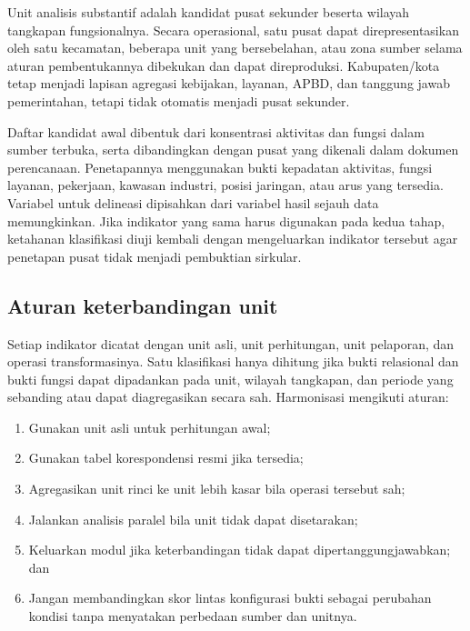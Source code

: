 \documentclass[11pt,a4paper,oneside,openany,indonesian]{report}
\begin{document}
Unit analisis substantif adalah kandidat pusat sekunder beserta wilayah
tangkapan fungsionalnya. Secara operasional, satu pusat dapat
direpresentasikan oleh satu kecamatan, beberapa unit yang bersebelahan,
atau zona sumber selama aturan pembentukannya dibekukan dan dapat
direproduksi. Kabupaten/kota tetap menjadi lapisan agregasi kebijakan,
layanan, APBD, dan tanggung jawab pemerintahan, tetapi tidak otomatis
menjadi pusat sekunder.

Daftar kandidat awal dibentuk dari konsentrasi aktivitas dan fungsi
dalam sumber terbuka, serta dibandingkan dengan pusat yang dikenali
dalam dokumen perencanaan. Penetapannya menggunakan bukti kepadatan
aktivitas, fungsi layanan, pekerjaan, kawasan industri, posisi jaringan,
atau arus yang tersedia. Variabel untuk delineasi dipisahkan dari
variabel hasil sejauh data memungkinkan. Jika indikator yang sama harus
digunakan pada kedua tahap, ketahanan klasifikasi diuji kembali dengan
mengeluarkan indikator tersebut agar penetapan pusat tidak menjadi
pembuktian sirkular.

\subsection{Aturan keterbandingan
unit}\label{aturan-keterbandingan-unit}

Setiap indikator dicatat dengan unit asli, unit perhitungan, unit
pelaporan, dan operasi transformasinya. Satu klasifikasi hanya dihitung
jika bukti relasional dan bukti fungsi dapat dipadankan pada unit,
wilayah tangkapan, dan periode yang sebanding atau dapat diagregasikan
secara sah. Harmonisasi mengikuti aturan:

\begin{enumerate}
\def\labelenumi{\arabic{enumi}.}
\tightlist
\item
  Gunakan unit asli untuk perhitungan awal;
\item
  Gunakan tabel korespondensi resmi jika tersedia;
\item
  Agregasikan unit rinci ke unit lebih kasar bila operasi tersebut sah;
\item
  Jalankan analisis paralel bila unit tidak dapat disetarakan;
\item
  Keluarkan modul jika keterbandingan tidak dapat dipertanggungjawabkan;
  dan
\item
  Jangan membandingkan skor lintas konfigurasi bukti sebagai perubahan
  kondisi tanpa menyatakan perbedaan sumber dan unitnya.
\end{enumerate}
\end{document}
